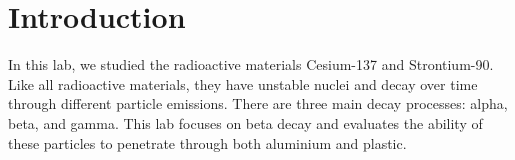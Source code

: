 
\section{Introduction} %
\label{sec:introduction}
In this lab, we studied the radioactive materials Cesium-137 and Strontium-90.  Like all radioactive materials, they have unstable nuclei and decay over time through different particle emissions.  There are three main decay processes: alpha, beta, and gamma.  This lab focuses on beta decay and evaluates the ability of these particles to penetrate through both aluminium and plastic.

